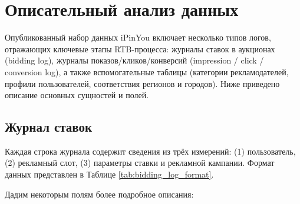 \section{Описательный анализ данных}
\label{sec:dataset_description}

Опубликованный набор данных iPinYou включает несколько типов логов, отражающих ключевые этапы RTB-процесса: журналы ставок в аукционах (bidding log), журналы показов/кликов/конверсий (impression / click / conversion log), а также вспомогательные таблицы (категории рекламодателей, профили пользователей, соответствия регионов и городов). Ниже приведено описание основных сущностей и полей.

\subsection{Журнал ставок}
Каждая строка журнала содержит сведения из трёх измерений: (1) пользователь, (2) рекламный слот, (3) параметры ставки и рекламной кампании. Формат данных представлен в Таблице \ref{tab:bidding_log_format}.

Дадим некоторым полям более подробное описания:

